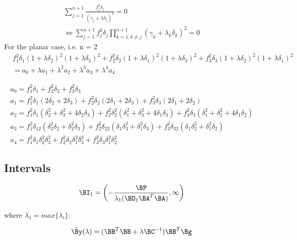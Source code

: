 \begin{eqnarray}
\sum^{n+1}_{j=1} \frac{f^2_j\delta_j}{\left(\gamma_j+\lambda\delta_j\right)^2} = 0 \\
\nonumber
\Leftrightarrow \sum^{n+1}_{j=1} f^2_j\delta_j \prod^{n+1}_{k=1,k\neq j}\left(\gamma_k + \lambda_k\delta_k\right)^2 = 0 
\end{eqnarray}
For the planar case, i.e. n = 2
\begin{equation}
\nonumber
\begin{aligned}
& f^2_1\delta_1(1 + \lambda\delta_2)^2(1 + \lambda\delta_3)^2 + f^2_2\delta_2(1 + \lambda\delta_1)^2(1 + \lambda\delta_3)^2 + f^2_3\delta_3(1 + \lambda\delta_2)^2(1 + \lambda\delta_1)^2 \\ 
& = a_0 + \lambda a_1 + \lambda^2 a_2 + \lambda^3 a_3 + \lambda^4 a_4
\end{aligned}
\end{equation}

\begin{eqnarray}
\nonumber
a_0 = f^2_1\delta_1 + f^2_2\delta_2 + f^2_3\delta_3 \\
\nonumber
a_1 = f^2_1\delta_1(2\delta_2 + 2\delta_3) + f^2_2\delta_2(2\delta_1 + 2\delta_3) + f^2_3\delta_3(2\delta_1 + 2\delta_2) \\
\nonumber
a_2 = f^2_1\delta_1(\delta^2_2 + \delta^2_3 + 4\delta_2\delta_3) + f^2_2\delta^2_2(\delta^2_1 + \delta^2_3 + 4\delta_1\delta_3) + f^2_3\delta_3(\delta^2_1 + \delta^2_2 + 4\delta_1\delta_2) \\
\nonumber
a_3 = f^2_1\delta_12(\delta^2_3\delta_2 + \delta^2_2\delta_3) + f^2_2\delta_22(\delta_1\delta^2_3 + \delta^2_1\delta_3) + f^2_3\delta_32(\delta_1\delta^2_2 + \delta^2_1\delta_2) \\
\nonumber
a_4 = f^2_1\delta_1\delta^2_2\delta^2_3 + f^2_2\delta_2\delta^2_1\delta^2_3 + f^2_3\delta_3\delta^2_1\delta^2_2
\end{eqnarray}

\subsection{Intervals}

\begin{equation}
\BI_1 = \left(-\frac{\BP}{\lambda_1(\BD_1\BA^T\BA)}, \infty\right)
\end{equation}

where $\lambda_1 = max\{\lambda_i\}$.

\begin{equation}
\tilde{\By}(\lambda) = (\BB^T\BB + \lambda\BC^{-1})\BB^T\Bg
\end{equation}


